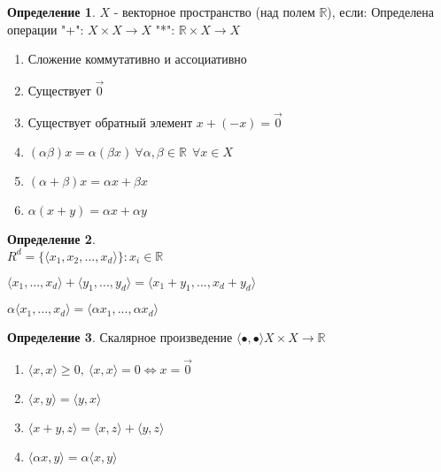 \documentclass[12pt,letterpaper]{report}
\theoremstyle{definition}
\newtheorem*{conj}{Определение}
\begin{document}
    \begin{conj}
        $X$ - векторное пространство (над полем $\mathbb{R}$), если:
        Определена операции "+": $X\times X \to X$
        "*": $\mathbb{R}\times X \to X$ \\
        \begin{enumerate}
            \item Сложение коммутативно и ассоциативно
            \item Существует $\overrightarrow{0}$
            \item Существует обратный элемент $x+(-x)=\overrightarrow{0}$
            \item $(\alpha \beta)x = \alpha(\beta x)\ \forall \alpha, \beta \in \mathbb{R}\ \ \forall x\in X$
            \item $(\alpha+\beta)x = \alpha x + \beta x$
            \item $\alpha(x+y) = \alpha x + \alpha y$
        \end{enumerate}
    \end{conj}
    \vspace*{0,5cm}

    \begin{conj}
        \quad \\
        $R^d = \{ \langle x_1, x_2,...,x_d\rangle  \}: x_i \in \mathbb{R}$
    
        $\langle x_1,...,x_d\rangle +\langle y_1,...,y_d\rangle =\langle x_1+y_1,..., x_d + y_d\rangle $
    
        $\alpha \langle x_1,...,x_d\rangle  = \langle \alpha x_1,..., \alpha x_d\rangle $
    \end{conj}
    
    \begin{conj}
        Скалярное произведение $\langle \bullet, \bullet\rangle X\times X \to \mathbb{R}$
    
        \begin{enumerate}
            \item $\langle x, x\rangle \geq 0,\ \langle x, x\rangle =0 \Longleftrightarrow x=\overrightarrow{0}$
            \item $\langle x, y\rangle = \langle y, x\rangle$
            \item $\langle x+y, z\rangle = \langle x, z\rangle + \langle y, z \rangle $
            \item $\langle \alpha x, y\rangle = \alpha \langle x, y \rangle $
        \end{enumerate}
    \end{conj}
    
\end{document}
